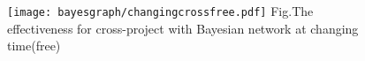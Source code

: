 \begin{figure}[htbp]
\centering
\texttt{[image: bayesgraph/changingcrossfree.pdf]}
{Fig.$\!$}{The effectiveness for cross-project with Bayesian network at changing time(free)}
\vspace{-1em}
\end{figure}

